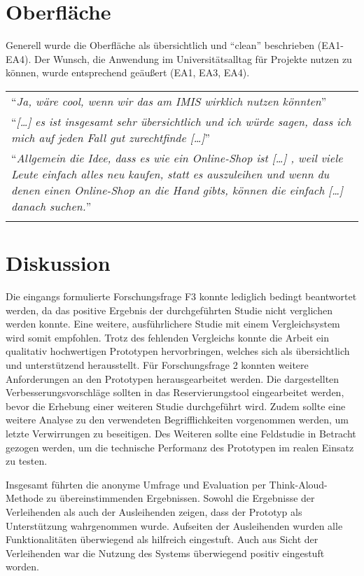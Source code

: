 \section{Oberfläche}
Generell wurde die Oberfläche als übersichtlich und \enquote{clean} beschrieben
(EA1-EA4). Der Wunsch, die Anwendung im Universitätsalltag für Projekte
nutzen zu können, wurde entsprechend geäußert (EA1, EA3, EA4).

\begin{longtable}{p{}} \arrayrulecolor{maincolor}\hline
        \enquote{\textit{Ja, wäre cool, wenn wir das am IMIS wirklich nutzen
        könnten}}                                                      \\
        \enquote{\textit{[\dots] es ist insgesamt sehr übersichtlich und ich würde
        sagen, dass ich mich auf jeden Fall gut zurechtfinde [\dots]}} \\
        \enquote{\textit{Allgemein die Idee, dass es wie ein Online-Shop ist [\dots] ,
                        weil viele Leute einfach alles neu kaufen, statt es auszuleihen und wenn du
                        denen einen Online-Shop an die Hand gibts, können die einfach [\dots] danach
        suchen.}}                                                      \\
        \arrayrulecolor{maincolor}\hline
\end{longtable}

\section{Diskussion}
\label{sec:disc}
Die eingangs formulierte Forschungsfrage F3 konnte lediglich bedingt beantwortet werden, da das
positive Ergebnis der durchgeführten Studie nicht verglichen werden konnte. Eine weitere,
ausführlichere Studie mit einem Vergleichsystem wird somit empfohlen. Trotz des fehlenden Vergleichs
konnte die Arbeit ein qualitativ hochwertigen Prototypen hervorbringen, welches sich als
übersichtlich und unterstützend herausstellt. Für Forschungsfrage 2 konnten weitere Anforderungen an
den Prototypen herausgearbeitet werden. Die dargestellten Verbesserungsvorschläge sollten in das
Reservierungstool eingearbeitet werden, bevor die Erhebung einer weiteren Studie durchgeführt wird.
Zudem sollte eine weitere Analyse zu den verwendeten Begrifflichkeiten vorgenommen werden, um letzte
Verwirrungen zu beseitigen. Des Weiteren sollte eine Feldstudie in Betracht gezogen werden, um die
technische Performanz des Prototypen im realen Einsatz zu testen.

Insgesamt führten die anonyme Umfrage und Evaluation per Think-Aloud-Methode zu übereinstimmenden
Ergebnissen. Sowohl die Ergebnisse der Verleihenden als auch der Ausleihenden zeigen, dass der
Prototyp als Unterstützung wahrgenommen wurde. Aufseiten der Ausleihenden wurden alle
Funktionalitäten überwiegend als hilfreich eingestuft. Auch aus Sicht der Verleihenden war die
Nutzung des Systems überwiegend positiv eingestuft worden.
